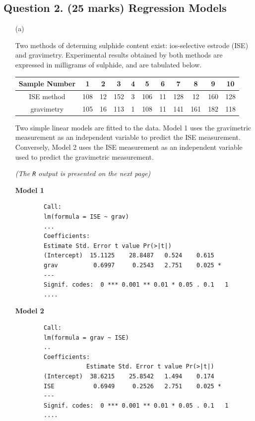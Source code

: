 \documentclass[a4paper,12pt]{article}
\begin{document}
\subsection*{Question 2. (25 marks) Regression Models }
\begin{itemize}
	\item[(a)]

Two methods of determing sulphide content exist: ios-selective estrode (ISE) and gravimetry. Experimental results obtained by both methods are expressed in milligrams of sulphide, and are tabulated below.
\begin{center}
	\begin{tabular}{|c|cccccccccc|}
		\hline
		Sample Number&1&2&3&4&5&6&7&8&9&10\\ \hline
		ISE method & 108 & 12& 152 & 3 & 106 & 11 &  128 & 12& 160& 128 \\ \hline
		gravimetry & 105 & 16& 113 & 1 & 108 &  11 & 141 & 161 & 182& 118\\
		\hline
	\end{tabular}
\end{center}
Two simple linear models are fitted to the data. Model 1 uses the gravimetric measurement as an independent variable to predict the ISE measurement. Conversely, Model 2 uses the ISE measurement as an independent variable used to predict the gravimetric measurement.

\medskip
\textit{(The \texttt{R} output is presented on the next page)}
\newpage
	\begin{framed}
\noindent \textbf{Model 1}
		\begin{verbatim}
		Call:
		lm(formula = ISE ~ grav)
		...
		Coefficients:
		Estimate Std. Error t value Pr(>|t|)
		(Intercept)  15.1125    28.8487   0.524    0.615
		grav          0.6997     0.2543   2.751    0.025 *
		---
		Signif. codes:  0 *** 0.001 ** 0.01 * 0.05 . 0.1   1
		....
		\end{verbatim}
	\end{framed}\smallskip

	\begin{framed}
\noindent \textbf{Model 2}
		\begin{verbatim}
		Call:
		lm(formula = grav ~ ISE)
		..
		Coefficients:
		            Estimate Std. Error t value Pr(>|t|)
		(Intercept)  38.6215    25.8542   1.494    0.174
		ISE           0.6949     0.2526   2.751    0.025 *
		---
		Signif. codes:  0 *** 0.001 ** 0.01 * 0.05 . 0.1   1
		....
		\end{verbatim}
	\end{framed}



\end{itemize}
\end{document}
